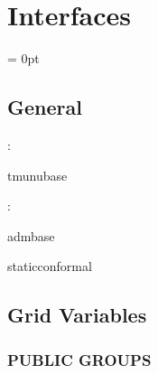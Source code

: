 
\section{Interfaces} 


\parskip = 0pt

\vspace{3mm} \subsection*{General}

: 

tmunubase
\vspace{2mm}

: 

admbase

staticconformal
\vspace{2mm}
\subsection*{Grid Variables}
\vspace{5mm}\subsubsection{PUBLIC GROUPS}

\vspace{5mm}

